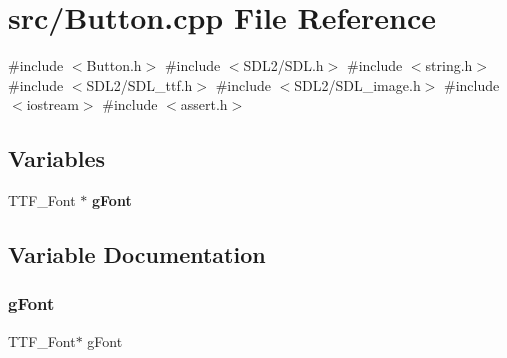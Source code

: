 \section{src/\+Button.cpp File Reference}
\label{_button_8cpp}
{\ttfamily \#include $<$Button.\+h$>$}\newline
{\ttfamily \#include $<$S\+D\+L2/\+S\+D\+L.\+h$>$}\newline
{\ttfamily \#include $<$string.\+h$>$}\newline
{\ttfamily \#include $<$S\+D\+L2/\+S\+D\+L\+\_\+ttf.\+h$>$}\newline
{\ttfamily \#include $<$S\+D\+L2/\+S\+D\+L\+\_\+image.\+h$>$}\newline
{\ttfamily \#include $<$iostream$>$}\newline
{\ttfamily \#include $<$assert.\+h$>$}\newline
\subsection*{Variables}
\begin{DoxyCompactItemize}
\item 
T\+T\+F\+\_\+\+Font $\ast$ \textbf{ g\+Font}
\end{DoxyCompactItemize}


\subsection{Variable Documentation}
\mbox{\label{_button_8cpp_a88e76957ec56f067af762125afcac25f}} 
\subsubsection{g\+Font}
{\footnotesize\ttfamily T\+T\+F\+\_\+\+Font$\ast$ g\+Font}

